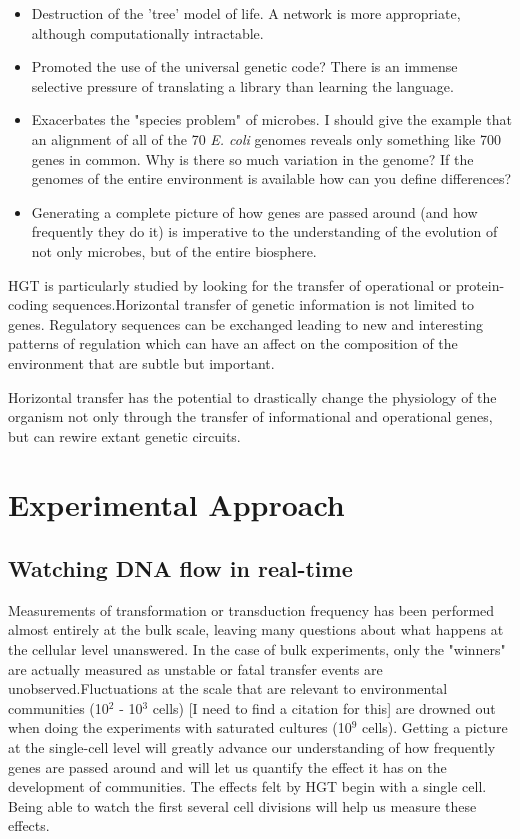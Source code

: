 \begin{itemize}
	\item Destruction of the 'tree' model of life. A network is more
		appropriate, although computationally intractable.
	\item Promoted the use of the universal genetic code? There is an
		immense selective pressure of translating a library than
		learning the language. 
	\item Exacerbates the "species problem" of microbes. I should give the
		example that an alignment of all of the 70 \textit{E. coli}
		genomes reveals only something like 700 genes in common. Why is
		there so much variation in the genome? If the genomes of the
		entire environment is available how can you define differences?
	\item Generating a complete picture of how genes are passed around (and
		how frequently they do it) is imperative to the understanding of
		the evolution of not only microbes, but of the entire biosphere. 
\end{itemize}

HGT is particularly studied by looking for the transfer of operational or
protein-coding sequences.Horizontal transfer of genetic information is not
limited to genes.  Regulatory sequences can be exchanged\cite{Oren:2014eea}
leading to new and interesting patterns of regulation which can have an affect
on the composition of the environment that are subtle but important.

Horizontal transfer has the potential to drastically change the physiology of
the organism not only through the transfer of informational and operational
genes, but can rewire extant genetic circuits.

\section*{Experimental Approach}
\subsection*{Watching DNA flow in real-time}

Measurements of transformation or transduction frequency has been performed
almost entirely at the bulk scale, leaving many questions about what happens at
the cellular level unanswered. In the case of bulk experiments, only the
"winners" are actually measured as unstable or fatal transfer events are
unobserved.Fluctuations at the scale that are relevant to environmental
communities  (10$^2$ - 10$^3$ cells) [I need to find a citation for this] are
drowned out when doing the experiments with saturated cultures (10$^9$ cells).
Getting a picture at the single-cell level will greatly advance our
understanding of how frequently genes are passed around and will let us quantify
the effect it has on the development of communities. The effects felt by HGT
begin with a single cell.  Being able to watch the first several cell divisions
will help us measure these effects.


